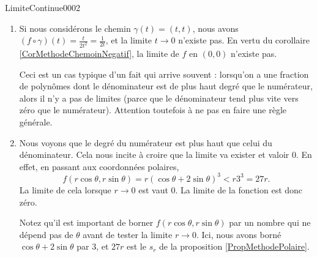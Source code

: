 \begin{corrige}{LimiteContinue0002}

	\begin{enumerate}
		\item
			Si nous considérons le chemin $\gamma(t)=(t,t)$, nous avons $(f\circ\gamma)(t)=\frac{ t }{ 2t^2 }=\frac{1}{ 2t }$, et la limite $t\to 0$ n'existe pas. En vertu du corollaire \ref{CorMethodeChemoinNegatif}, la limite de $f$ en $(0,0)$ n'existe pas.

			Ceci est un cas typique d'un fait qui arrive souvent : lorsqu'on a une fraction de polynômes dont le dénominateur est de plus haut degré que le numérateur, alors il n'y a pas de limites (parce que le dénominateur tend plus vite vers zéro que le numérateur). Attention toutefois à ne pas en faire une règle générale.

		\item
			Nous voyons que le degré du numérateur est plus haut que celui du dénominateur. Cela nous incite à croire que la limite va exister et valoir $0$. En effet, en passant aux coordonnées polaires,
			\begin{equation}
				f(r\cos\theta,r\sin\theta)=r(\cos\theta+2\sin\theta)^3<r3^3=27r.
			\end{equation}
			La limite de cela lorsque $r\to 0$ est vaut $0$. La limite de la fonction est donc zéro.

			Notez qu'il est important de borner $f(r\cos\theta,r\sin\theta)$ par un nombre qui ne dépend pas de $\theta$ avant de tester la limite $r\to 0$. Ici, nous avons borné $\cos\theta+2\sin\theta$ par $3$, et $27r$ est le $s_r$ de la proposition \ref{PropMethodePolaire}.

	\end{enumerate}

\end{corrige}
